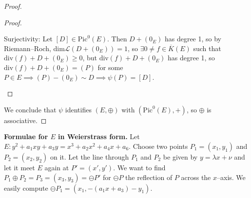 \documentclass{article}
\theoremstyle{definition}
\begin{document}
\begin{proof}
\begin{proof}
\begin{enumerate}[(i)]
            Surjectivity: Let $[D] \in \text{Pic}^0(E)$. Then $D + (0_E)$ has degree 1, so by Riemann--Roch, $\text{dim}\mathcal{L}(D+(0_E)) = 1$, so $\exists 0\neq f \in \overline{K}(E)$ such that $\text{div}(f) + D + (0_E) \ge 0$, but $\text{div}(f) + D + (0_E)$ has degree 1, so $\text{div}(f) + D + (0_E) = (P)$ for some $P \in E \implies (P) - (0_E) \sim D \implies  \psi(P) = [D]$. 
        \end{enumerate}
    \end{proof}
    We conclude that $\psi$ identifies $(E,\oplus)$ with $(\text{Pic}^0(E), +)$, so $\oplus$ is associative.
\end{proof}

\textbf{Formulae for $E$ in Weierstrass form.}
Let $E : y^2 + a_1xy + a_3 y  = x^3 +a_2x^2 + a_4 x + a_6$. Choose two points $P_1 = (x_1, y_1)$ and $P_2 = (x_2, y_2)$ on it. Let the line through $P_1$ and $P_2$ be given by $y = \lambda x + \nu$ and let it meet $E$ again at $P' = (x', y')$. We want to find $P_1 \oplus P_2 = P_3 = (x_3, y_3) = \ominus P'$ for $\ominus P$ the reflection of $P$ across the $x$--axis. We easily compute $\ominus P_1 = (x_1, -(a_1x +a_3)-y_1)$. 
\vspace{1mm}
 
\end{document}

